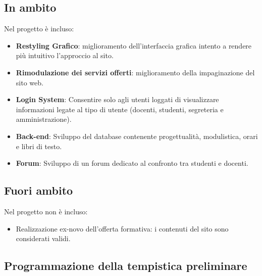 \documentclass{article}
\begin{document}
\begin{flushleft}
    
		\subsection{In ambito}

		Nel progetto è incluso:\\

	    \begin{itemize}

			\item \textbf{Restyling Grafico}: miglioramento dell'interfaccia grafica intento a rendere più intuitivo l'approccio al sito. 

			\item \textbf{Rimodulazione dei servizi offerti}: miglioramento della impaginazione del sito web.

			\item \textbf{Login System}: Consentire solo agli utenti loggati di visualizzare informazioni legate al tipo di utente (docenti, studenti, segreteria e amministrazione).

			\item \textbf{Back-end}: Sviluppo del database contenente progettualità, modulistica, orari e libri di testo.
			
			\item \textbf{Forum}: Sviluppo di un forum dedicato al confronto tra  studenti e docenti.

		\end{itemize}

		\subsection{Fuori ambito}

		Nel progetto non è incluso:

		\begin{itemize}

			\item Realizzazione ex-novo dell'offerta formativa: i contenuti del sito sono considerati validi.

		\end{itemize}

		\vspace{2mm}

		\subsection{Programmazione della tempistica preliminare}

		\begin{tabular}{ |p{6cm}|p{4cm}|  }


\end{tabular}
\end{flushleft}
\end{document}
